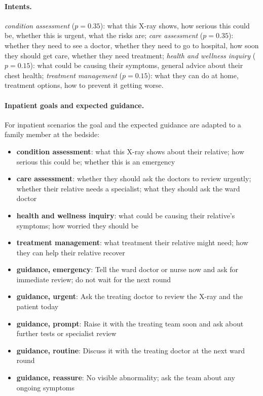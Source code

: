 \paragraph{Intents.} \emph{condition assessment} ($p=0.35$): what this X-ray shows, how serious this could be, whether this is urgent, what the risks are; \emph{care assessment} ($p=0.35$): whether they need to see a doctor, whether they need to go to hospital, how soon they should get care, whether they need treatment; \emph{health and wellness inquiry} ($p=0.15$): what could be causing their symptoms, general advice about their chest health; \emph{treatment management} ($p=0.15$): what they can do at home, treatment options, how to prevent it getting worse.

\paragraph{Inpatient goals and expected guidance.} For inpatient scenarios the goal and the expected guidance are adapted to a family member at the bedside:

\begin{itemize}[leftmargin=*,itemsep=1pt]\item \textbf{condition assessment}: what this X-ray shows about their relative; how serious this could be; whether this is an emergency\item \textbf{care assessment}: whether they should ask the doctors to review urgently; whether their relative needs a specialist; what they should ask the ward doctor\item \textbf{health and wellness inquiry}: what could be causing their relative's symptoms; how worried they should be\item \textbf{treatment management}: what treatment their relative might need; how they can help their relative recover\item \textbf{guidance, emergency}: Tell the ward doctor or nurse now and ask for immediate review; do not wait for the next round\item \textbf{guidance, urgent}: Ask the treating doctor to review the X-ray and the patient today\item \textbf{guidance, prompt}: Raise it with the treating team soon and ask about further tests or specialist review\item \textbf{guidance, routine}: Discuss it with the treating doctor at the next ward round\item \textbf{guidance, reassure}: No visible abnormality; ask the team about any ongoing symptoms\end{itemize}

